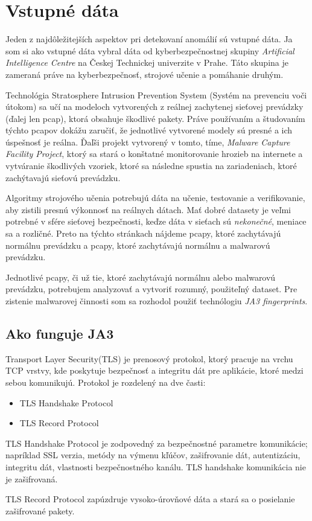 \section{Vstupné dáta}
 Jeden z najdôležitejších aspektov pri detekovaní anomálií sú vstupné dáta. Ja som si ako vstupné dáta vybral dáta od kyberbezpečnostnej skupiny \emph{ Artificial Intelligence Centre}  na Českej Technickej univerzite v Prahe. Táto skupina je zameraná práve na kyberbezpečnosť, strojové učenie a pomáhanie druhým.\cite{strato} \par
 Technológia Stratosphere Intrusion Prevention System (Systém na prevenciu voči útokom) sa učí na modeloch vytvorených z reálnej zachytenej sieťovej prevádzky (ďalej len pcap), ktorá obsahuje škodlivé pakety. Práve používaním a študovaním týchto pcapov dokážu zaručiť, že jednotlivé vytvorené modely sú presné a ich úspešnosť je reálna. Ďaľši projekt vytvorený v tomto, tíme, \emph{Malware Capture Facility Project}, ktorý sa stará o konštatné monitorovanie hrozieb na internete a vytváranie škodlivých vzoriek, ktoré sa následne spustia na zariadeniach, ktoré zachýtavajú sieťovú prevádzku.\cite{strato}\par
 Algoritmy strojového učenia potrebujú dáta na učenie, testovanie a verifikovanie, aby zistili presnú výkonnosť na reálnych dátach. Mať dobré datasety je veľmi potrebné v sfére sieťovej bezpečnosti, keďze dáta v sieťach sú \emph{nekonečné}, meniace sa a rozličné. Preto na týchto stránkach nájdeme pcapy, ktoré zachytávajú normálnu prevádzku a pcapy, ktoré zachytávajú normálnu a malwarovú prevádzku.\cite{stratosphere}\par
 Jednotlivé pcapy, či už tie, ktoré zachytávajú normálnu alebo malwarovú prevádzku, potrebujem analyzovať a vytvoriť rozumný, použiteľný dataset. Pre zistenie malwarovej činnosti som sa rozhodol použiť technólogiu \emph{JA3 fingerprints}.
 \subsection{Ako funguje JA3}
 Transport Layer Security(TLS)\cite{TCP} je prenosový protokol, ktorý pracuje na vrchu TCP vrstvy, kde poskytuje bezpečnosť a integritu dát pre aplikácie, ktoré medzi sebou komunikujú. Protokol je rozdelený na dve časti:
 \begin{itemize}
  \item TLS Handshake Protocol
  \item TLS Record Protocol
\end{itemize}
TLS Handshake Protocol je zodpovedný za bezpečnostné parametre komunikácie; napríklad SSL verzia, metódy na výmenu kľúčov, zašifrovanie dát, autentizáciu, integritu dát, vlastnosti bezpečnostného kanálu.
TLS handshake komunikácia nie je zašifrovaná.\par
TLS Record Protocol zapúzdruje vysoko-úrovňové dáta a stará sa o posielanie zašifrované pakety. \cite{ja3}

